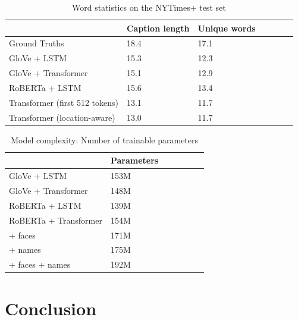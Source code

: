 \documentclass[10pt,twocolumn,letterpaper]{article}
\begin{document}
\begin{table}[t]
	\caption {Word statistics on the NYTimes+ test set}
	\label{tab:results-stats}
	\centering
	\begin{tabular}{lllllll}
		\toprule
        & Caption length  & Unique words \\
      \midrule
      Ground Truths & 18.4 & 17.1 \\
      GloVe + LSTM  & 15.3 & 12.3 \\
      GloVe + Transformer  & 15.1 & 12.9 \\
      RoBERTa + LSTM  & 15.6 & 13.4 \\
      Transformer (first 512 tokens)  & 13.1 & 11.7 \\
      Transformer (location-aware) & 13.0 & 11.7  \\
		\bottomrule
	\end{tabular}
\end{table}


\begin{table}[t]
	\caption {Model complexity: Number of trainable parameters}
	\label{tab:models}
	\centering
	\begin{tabular}{lllllll}
		\toprule
        & Parameters \\
      \midrule
      GloVe + LSTM & 153M \\
      GloVe + Transformer & 148M \\
      RoBERTa + LSTM & 139M \\
      RoBERTa + Transformer & 154M \\
        + faces & 171M \\
        + names & 175M \\
        + faces + names & 192M \\
		\bottomrule
	\end{tabular}
\end{table}

\section{Conclusion}

{\small


}
\end{document}
